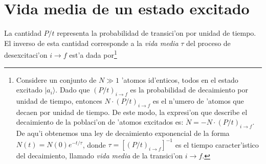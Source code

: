 \section{Vida media de un estado excitado}

La cantidad $P/t$ representa la probabilidad de transici'on por unidad de
tiempo. El inverso de esta cantidad corresponde a la \textit{vida media} $\tau$
del proceso de desexcitaci'on $i\rightarrow f$ est'a dada
por\footnote{Considere un conjunto de $N\gg1$ 'atomos id'enticos, todos en el
estado excitado $|a_i\rangle $. Dado que $(P/t)_{i\rightarrow f}$ es la
probabilidad de decaimiento por unidad de tiempo, entonces
$N\cdot (P/t)_{i\rightarrow f}$ es el n'umero de 'atomos que decaen por unidad
de tiempo. De este modo, la expresi'on que describe el decaimiento de la
poblaci'on de 'atomos excitados es: $\dot{N}=-N\cdot (P/t)_{i\rightarrow f}$. De
aqu'i obtenemos una ley de decaimiento exponencial de la forma $N(t)=N(0)
e^{-t/\tau}$, donde $\tau=\left[(P/t)_{i\rightarrow f}\right]^{-1}$ es el tiempo
caracter'istico del decaimiento, llamado \textit{vida media} de la transici'on
$i\rightarrow f$.}

